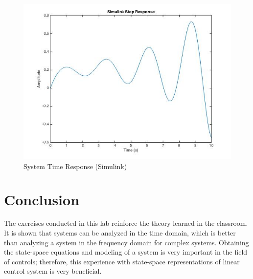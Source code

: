 \documentclass[12pt]{article}
\begin{document}
\newpage

\begin{figure}[htbp] %
   \centering
   \includegraphics[width=6in]{simulink_model_time_response.jpg} 
   \caption{System Time Response (Simulink)}
   \label{fig:example}
\end{figure}

\bigskip


\section*{\fontsize{12}{12}\selectfont \large Conclusion}
The exercises conducted in this lab reinforce the theory learned in the classroom. It is shown that systems can be analyzed in the time domain, which is better than analyzing a system in the frequency domain for complex systems. Obtaining the state-space equations and modeling of a system is very important in the field of controls; therefore, this experience with state-space representations of linear control system is very beneficial.





\begin{thebibliography}{2}


\end{thebibliography}




\end{document}
